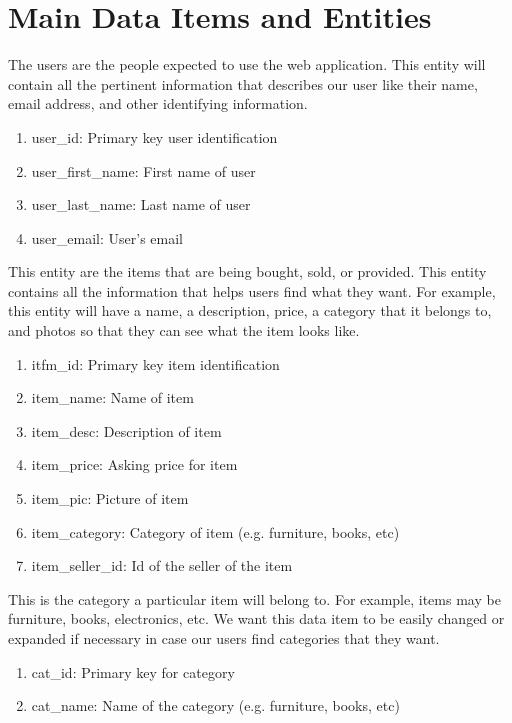 \section{Main Data Items and Entities}

\begin{description}[font=\bfseries\itshape]

\item[user:] The users are the people expected to use the web application. This entity will contain all the pertinent information that describes our user like their name, email address, and other identifying information.
\begin{enumerate}
\item user\_id: Primary key user identification
\item user\_first\_name: First name of user
\item user\_last\_name: Last name of user
\item user\_email: User's email
\end{enumerate}
	
\item[item:] This entity are the items that are being bought, sold, or provided.  This entity contains all the information that helps users find what they want.  For example, this entity will have a name, a description, price, a category that it belongs to, and photos so that they can see what the item looks like.
\begin{enumerate}
\item itfm\_id: Primary key item identification
\item item\_name: Name of item
\item item\_desc: Description of item
\item item\_price: Asking price for item
\item item\_pic: Picture of item
\item item\_category: Category of item (e.g. furniture, books, etc)
\item item\_seller\_id: Id of the seller of the item
\end{enumerate}
	
\item[category:] This is the category a particular item will belong to.  For example, items may be furniture, books, electronics, etc.  We want this data item to be easily changed or expanded if necessary in case our users find categories that they want.
\begin{enumerate}
\item cat\_id: Primary key for category
\item cat\_name: Name of the category (e.g. furniture, books, etc)
\end{enumerate}


\end{description}
